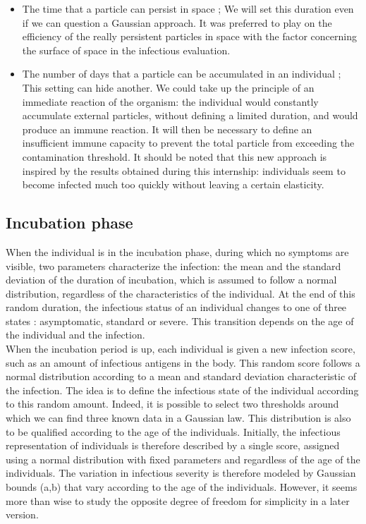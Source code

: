 \begin{itemize}

\item The time that a particle can persist in space ; We will set this duration even if we can question a Gaussian approach. It was preferred to play on the efficiency of the really persistent particles in space with the factor concerning the surface of space in the infectious evaluation.\\

\item The number of days that a particle can be accumulated in an individual ; This setting can hide another. We could take up the principle of an immediate reaction of the organism: the individual would constantly accumulate external particles, without defining a limited duration, and would produce an immune reaction. It will then be necessary to define an insufficient immune capacity to prevent the total particle from exceeding the contamination threshold. It should be noted that this new approach is inspired by the results obtained during this internship: individuals seem to become infected much too quickly without leaving a certain elasticity.\\

\end{itemize}

\subsection{Incubation phase}

When the individual is in the incubation phase, during which no symptoms are visible, two parameters characterize the infection: the mean and the standard deviation of the duration of incubation, which is assumed to follow a normal distribution, regardless of the characteristics of the individual. At the end of this random duration, the infectious status of an individual changes to one of three states : asymptomatic, standard or severe. This transition depends on the age of the individual and the infection.\\

When the incubation period is up, each individual is given a new infection score, such as an amount of infectious antigens in the body. This random score follows a normal distribution according to a mean and standard deviation characteristic of the infection. The idea is to define the infectious state of the individual according to this random amount. Indeed, it is possible to select two thresholds around which we can find three known data in a Gaussian law. This distribution is also to be qualified according to the age of the individuals. Initially, the infectious representation of individuals is therefore described by a single score, assigned using a normal distribution with fixed parameters and regardless of the age of the individuals. The variation in infectious severity is therefore modeled by Gaussian bounds (a,b) that vary according to the age of the individuals. However, it seems more than wise to study the opposite degree of freedom for simplicity in a later version.\\


